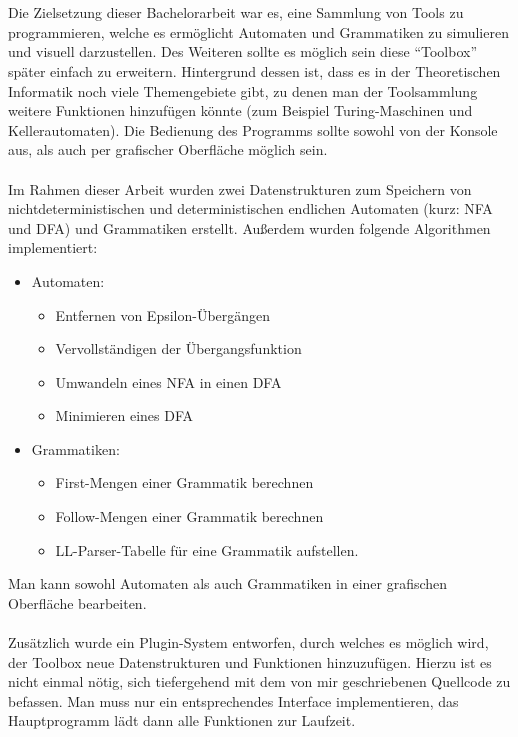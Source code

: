 \section*{}
Die Zielsetzung dieser Bachelorarbeit war es, eine Sammlung von Tools zu programmieren, welche es ermöglicht Automaten und Grammatiken zu simulieren und visuell darzustellen. Des Weiteren sollte es möglich sein diese "`Toolbox"' später einfach zu erweitern. Hintergrund dessen ist, dass es in der Theoretischen Informatik noch viele Themengebiete gibt, zu denen man der Toolsammlung weitere Funktionen hinzufügen könnte (zum Beispiel Turing-Maschinen und Kellerautomaten). Die Bedienung des Programms sollte sowohl von der Konsole aus, als auch per grafischer Oberfläche möglich sein.\\
\\
Im Rahmen dieser Arbeit wurden zwei Datenstrukturen zum Speichern von nichtdeterministischen und deterministischen endlichen Automaten (kurz: NFA und DFA) und Grammatiken erstellt. Außerdem wurden folgende Algorithmen implementiert:
\begin{itemize}
	\item Automaten:
	\begin{itemize}
		\item Entfernen von Epsilon-Übergängen
		\item Vervollständigen der Übergangsfunktion
		\item Umwandeln eines NFA in einen DFA
		\item Minimieren eines DFA
	\end{itemize}
	\item Grammatiken:
	\begin{itemize}
		\item First-Mengen einer Grammatik berechnen
		\item Follow-Mengen einer Grammatik berechnen
		\item LL-Parser-Tabelle für eine Grammatik aufstellen.
	\end{itemize}
\end{itemize}
Man kann sowohl Automaten als auch Grammatiken in einer grafischen Oberfläche bearbeiten.\\
\\
Zusätzlich wurde ein Plugin-System entworfen, durch welches es möglich wird, der Toolbox neue Datenstrukturen und Funktionen hinzuzufügen. Hierzu ist es nicht einmal nötig, sich tiefergehend mit dem von mir geschriebenen Quellcode zu befassen. Man muss nur ein entsprechendes Interface implementieren, das Hauptprogramm lädt dann alle Funktionen zur Laufzeit.